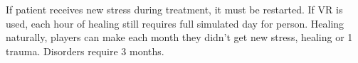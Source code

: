 \begin{itemize}
    \itembox If patient receives new stress during treatment, it must be restarted.
    \itembox If VR is used, each hour of healing still requires full simulated day for person.
    \itembox Healing naturally, players can make  each month they didn't get new
            stress, healing  or \num{1} trauma. Disorders require \num{3} months.
\end{itemize}
